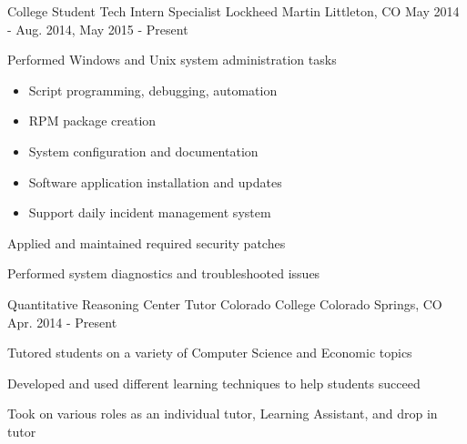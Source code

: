 


\begin{cventries}


\cventry
{College Student Tech Intern Specialist} %
{Lockheed Martin} %
{Littleton, CO} %
{May 2014 - Aug. 2014, May 2015 - Present} %
{ %
\begin{cvitems}
\item {Performed Windows and Unix system administration tasks}
  \begin{itemize}
  \item{Script programming, debugging, automation}
  \item{RPM package creation}
  \item{System configuration and documentation}
  \item{Software application installation and updates}
  \item{Support daily incident management system}
  \end{itemize}
\item {Applied and maintained required security patches}
\item {Performed system diagnostics and troubleshooted issues}
\end{cvitems}
}


\cventry
{Quantitative Reasoning Center Tutor} %
{Colorado College} %
{Colorado Springs, CO} %
{Apr. 2014 - Present} %
{ %
\begin{cvitems}
\item {Tutored students on a variety of Computer Science and Economic topics}
\item {Developed and used different learning techniques to help students succeed}
\item {Took on various roles as an individual tutor, Learning Assistant, and drop in tutor}
\end{cvitems}
}


\end{cventries}

